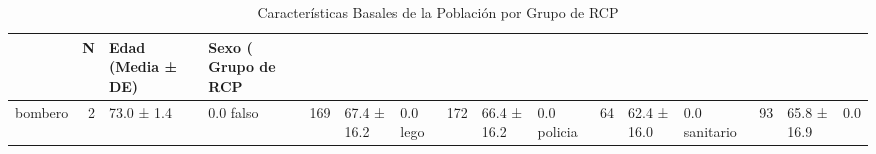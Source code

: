 \begin{table}[ht!]
\caption{Características Basales de la Población por Grupo de RCP}
\label{tab:caracteristicas_basales}
\begin{tabular}{lrlllllll}
\toprule
 & N & Edad (Media ± DE) & Sexo (%
Grupo de RCP &  &  &  &  &  &  &  &  \\
\midrule
 bombero      & 2 & 73.0 ± 1.4 & 0.0%
 falso        & 169 & 67.4 ± 16.2 & 0.0%
 lego         & 172 & 66.4 ± 16.2 & 0.0%
 policia      & 64 & 62.4 ± 16.0 & 0.0%
 sanitario    & 93 & 65.8 ± 16.9 & 0.0%
\bottomrule
\end{tabular}
\end{table}
